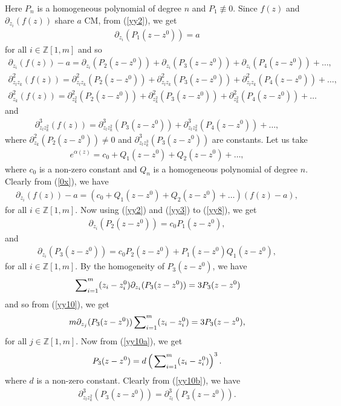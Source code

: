 \documentclass[11pt, reqno]{amsart}
\numberwithin{equation}{section}
\begin{document}
Here $P_n$ is a homogeneous polynomial of degree $n$ and $P_1\not\equiv 0$. Since $f(z)$ and $\partial_{z_i}(f(z))$ share $a$ CM, from (\ref{yy2}), we get 
\begin{align}\label{yy2a}
\partial_{z_i}(P_1(z-z^0))=a
\end{align}
for all $i\in\mathbb{Z}[1,m]$ and so
\begin{align}\label{yy3} 
\partial_{z_i}(f(z))-a=\partial_{z_i}(P_2(z-z^0))+\partial_{z_i}(P_3(z-z^0))+\partial_{z_i}(P_4(z-z^0))+\ldots,
\end{align}
\begin{align}\label{yy4} 
\partial^2_{z_l z_k}(f(z))=\partial^2_{z_lz_k}(P_2(z-z^0))+\partial^2_{z_lz_k}(P_3(z-z^0))+\partial^2_{z_lz_k}(P_4(z-z^0))+\ldots,
\end{align}
\begin{align}
\label{yy5} \partial^2_{z_k}(f(z))=\partial^2_{z_k^2}(P_2(z-z^0))+\partial^2_{z_k^2}(P_3(z-z^0))+\partial^2_{z_k^2}(P_4(z-z^0))+\ldots
\end{align}
and 
\begin{align}\label{yy6} 
\partial^3_{z_lz_k^2}(f(z))=\partial^3_{z_lz_k^2}(P_3(z-z^0))+\partial^3_{z_lz_k^2}(P_4(z-z^0))+\ldots,
\end{align}
where $\partial^2_{z_k}(P_2(z-z^0))\neq 0$ and $\partial^3_{z_lz_k^3}(P_3(z-z^0))$ are constants. 
Let us take
\begin{align*}
e^{\alpha(z)}=c_0+Q_1(z-z^0)+Q_2(z-z^0)+\ldots,
\end{align*}
where $c_0$ is a non-zero constant and $Q_n$ is a homogeneous polynomial of degree $n$. Clearly from (\ref{0x}), we have
\begin{align}\label{yy8} 
\partial_{z_i}(f(z))-a=(c_0+Q_1(z-z^0)+Q_2(z-z^0)+\ldots)(f(z)-a),
\end{align}
for all $i\in\mathbb{Z}[1,m]$.
Now using (\ref{yy2}) and (\ref{yy3}) to (\ref{yy8}), we get
\begin{align}\label{yy9}
\partial_{z_i}(P_2(z-z^0))=c_0P_1(z-z^0),
\end{align}
and
\begin{align}\label{yy10} 
\partial_{z_i}(P_3(z-z^0))=c_0P_2(z-z^0)+P_1(z-z^0)Q_1(z-z^0),
\end{align}
for all $i\in\mathbb{Z}[1,m]$.
By the homogeneity of $P_3(z-z^0)$, we have
\begin{align*}
\sideset{}{_{i=1}^m}{\sum} (z_i-z_i^0)\partial_{z_i}(P_3(z-z^0))=3P_3(z-z^0)
\end{align*}
and so from (\ref{yy10}), we get
\begin{align}\label{yy10a}
m\partial_{z_j}(P_3(z-z^0))\sideset{}{_{i=1}^m}{\sum} (z_i-z_i^0)=3P_3(z-z^0),
\end{align}
for all $j\in\mathbb{Z}[1,m]$. Now from (\ref{yy10a}), we get
\begin{align}\label{yy10b} 
P_3(z-z^0)=d\left(\sideset{}{_{i=1}^m}{\sum} (z_i-z_i^0)\right)^3.
\end{align}
where $d$ is a non-zero constant. Clearly from (\ref{yy10b}), we have
\begin{align}\label{yy10c} 
\partial_{z_l z_k^2}^3(P_3(z-z^0))=\partial_{z_l}^3(P_3(z-z^0)).
\end{align}
\end{document}
